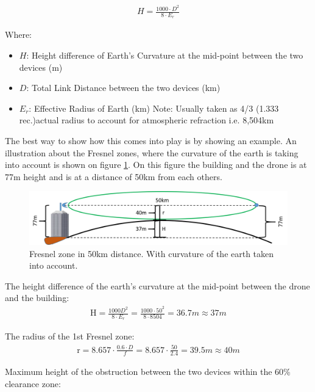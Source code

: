 \begin{align}
H = \frac{1000\cdot D^2}{8\cdot E_r}
\end{align}

Where:
\begin{itemize}[label=]
    \item $H$: Height difference of Earth's Curvature at the mid-point between the two devices (m)
    \item $D$: Total Link Distance between the two devices (km)
    \item $E_r$:  Effective Radius of Earth (km) Note: Usually taken as 4/3 (1.333 rec.)actual radius to account for atmospheric refraction i.e. 8,504km
\end{itemize}

\noindent The best way to show how this comes into play is by showing an example. An illustration about the Fresnel zones, where the curvature of the earth is taking into account is shown on figure \ref{fig:fresnel_50km_curvature}. On this figure the building and the drone is at 77m height and is at a distance of 50km from each others. 

\begin{figure}[H]
	\centering
	\includegraphics[scale=0.50]{figures/fresnel_50km_curvature.png}
	\caption{Fresnel zone in 50km distance. With curvature of the earth taken into account.}
	\label{fig:fresnel_50km_curvature}
\end{figure}  

\noindent The height difference of the earth's curvature at the mid-point between the drone and the building:
\begin{align}
\text{H} = \frac{1000 D^2}{8 \cdot E_r} = \frac{1000 \cdot 50^2}{8\cdot 8504} = 36.7m \approx 37m
\end{align}

\noindent The radius of the 1st Fresnel zone:
\begin{align*}
\text{r} = 8.657\cdot \frac{0.6\cdot D}{f} = 8.657\cdot \frac{50}{2.4} = 39.5m \approx 40m 
\end{align*}

\noindent Maximum height of the obstruction between the two devices within the 60\% clearance zone:

